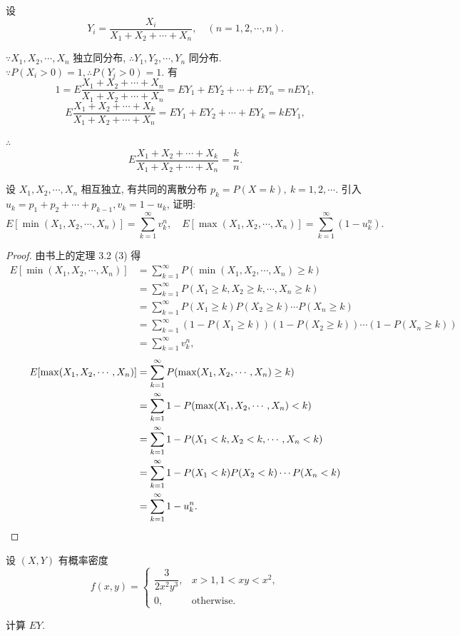 \documentclass[color=black,device=normal,lang=cn]{elegantnote}
\numberwithin{equation}{section}
\theoremstyle{plain}
\numberwithin{exercise}{exsection}
\begin{document}
\begin{solution}
    设
    \[Y_i=\dfrac{X_i}{X_1+X_2+\cdots+X_n},\quad (n=1,2,\cdots,n).\]
    
    $\because X_1,X_2,\cdots,X_n$ 独立同分布, $\therefore Y_1,Y_2,\cdots,Y_n$ 同分布. $\because P(X_i>0)=1,\therefore P(Y_i>0)=1$. 有
    \[1=E\dfrac{X_1+X_2+\cdots+X_n}{X_1+X_2+\cdots+X_n}=EY_1+EY_2+\cdots+EY_n=nEY_1,\]
    \[E\dfrac{X_1+X_2+\cdots+X_k}{X_1+X_2+\cdots+X_n}=EY_1+EY_2+\cdots+EY_k=kEY_1,\]

    $\therefore$
    \[E\dfrac{X_1+X_2+\cdots+X_k}{X_1+X_2+\cdots+X_n}=\dfrac{k}{n}.\]
\end{solution}
\addtocounter{exercise}{2}
\begin{exercise}%
    设 $X_1,X_2,\cdots,X_n$ 相互独立, 有共同的离散分布 $p_k=P(X=k),\ k=1,2,\cdots$. 引入 $u_k=p_1+p_2+\cdots+p_{k-1},v_k=1-u_k$, 证明:
    \[E[\min(X_1,X_2,\cdots,X_n)]=\sum\limits_{k=1}^\infty v_k^n,\quad E[\max(X_1,X_2,\cdots,X_n)]=\sum\limits_{k=1}^\infty(1-u_k^n).\]
\end{exercise}
\begin{proof}
    由书上的定理 3.2 (3) 得
    \begin{align*}
        E[\min(X_1,X_2,\cdots,X_n)] & =\sum\limits_{k=1}^\infty P(\min(X_1,X_2,\cdots,X_n)\geq k) \\
        & =\sum\limits_{k=1}^\infty P(X_1\geq k,X_2\geq k,\cdots,X_n\geq k) \\
        & =\sum\limits_{k=1}^\infty P(X_1\geq k)P(X_2\geq k)\cdots P(X_n\geq k) \\
        & =\sum\limits_{k=1}^\infty (1-P(X_1\geq k))(1-P(X_2\geq k))\cdots(1-P(X_n\geq k)) \\
        & =\sum\limits_{k=1}^\infty v_k^n,
    \end{align*}
    \begin{align*}
        E[\max(X_1,X_2,\cdots,X_n)] & =\sum\limits_{k=1}^\infty P(\max(X_1,X_2,\cdots,X_n)\geq k) \\
        & =\sum\limits_{k=1}^\infty1-P(\max(X_1,X_2,\cdots,X_n)<k) \\
        & =\sum\limits_{k=1}^\infty1-P(X_1<k,X_2<k,\cdots,X_n<k) \\
        & =\sum\limits_{k=1}^\infty1-P(X_1<k)P(X_2<k)\cdots P(X_n<k) \\
        & =\sum\limits_{k=1}^\infty1-u_k^n.\qedhere
    \end{align*}
\end{proof}
\begin{exercise}[1]%
    设 $(X,Y)$ 有概率密度
    \[f(x,y)=\begin{cases}
        \dfrac{3}{2x^2y^3}, & x>1,1<xy<x^2, \\[6pt]
        0, & \text{otherwise}.
    \end{cases}\]

    计算 $EY$.
\end{exercise}
\end{document}

